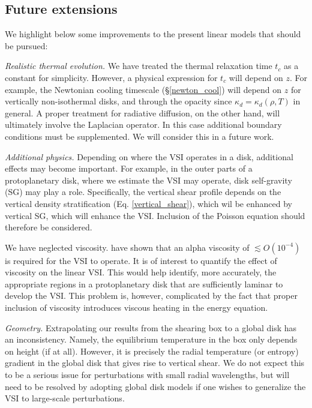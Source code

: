 

\subsection{Future extensions} 
We highlight below some improvements to the present  
linear models that should be pursued:

\emph{Realistic thermal evolution.} We have treated the thermal
relaxation time $t_c$ as a constant for simplicity. However, a
physical expression for $t_c$ will depend on 
$z$. For example, the Newtonian cooling timescale
(\S\ref{newton_cool}) will depend on $z$ for vertically non-isothermal
disks, and through the opacity since 
$\kappa_d=\kappa_d(\rho,T)$ in general. 
A proper treatment for radiative diffusion, on the other hand, will
ultimately involve the Laplacian operator. In this case additional
boundary conditions must be supplemented. We will consider this in a
future work.  



\emph{Additional physics.} Depending on where the VSI operates in a
disk, additional effects may become important. For example, in the
outer parts of a protoplanetary disk, where we estimate the VSI may
operate, disk self-gravity (SG) may play a role. Specifically, the vertical
shear profile depends on the vertical density stratification
(Eq. \ref{vertical_shear}), which wil be enhanced by vertical SG,
which will enhance the VSI. Inclusion of the Poisson equation should
therefore be considered. 

We have neglected viscosity. \cite{nelson13} have shown that an
alpha viscosity of $\lesssim O(10^{-4})$ is required for the VSI to
operate. It is of interest to quantify the effect of viscosity
on the linear VSI. This would help identify, more accurately, the
appropriate regions in a protoplanetary disk that are sufficiently
laminar to develop the VSI.  This problem is, however, complicated by
the fact that proper inclusion of viscosity introduces viscous heating
in the energy equation. 


\emph{Geometry.} Extrapolating our results from the shearing box to a global disk  
has an inconsistency. Namely, the equilibrium temperature in the
box only depends on height (if at all). However, it is precisely the
radial temperature (or entropy) gradient in the global disk that
gives rise to vertical shear. We do not expect this to be a serious issue for 
perturbations with small radial wavelengths, 
but will need to be resolved by adopting global disk models  
if one wishes to generalize the VSI to large-scale perturbations. 


